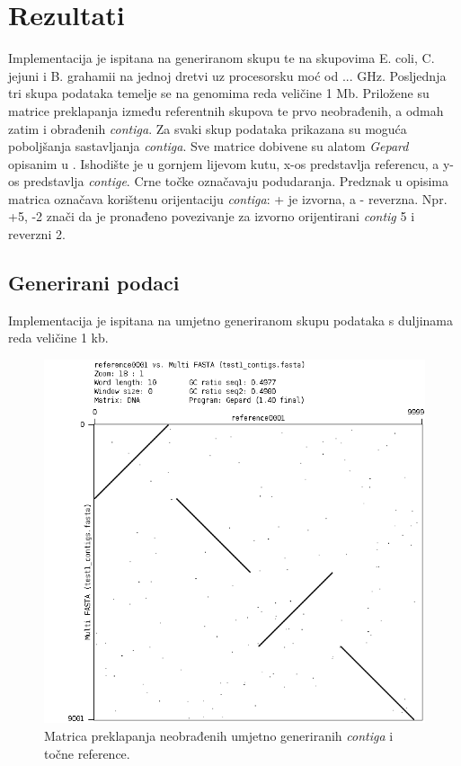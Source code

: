 \documentclass[times, utf8, seminar, numeric]{fer}
\begin{document}
\chapter{Rezultati}
Implementacija je ispitana na generiranom skupu te na skupovima E. coli, C. jejuni i B. grahamii na jednoj dretvi uz procesorsku moć od ... GHz. Posljednja tri skupa podataka temelje se na genomima reda veličine 1 Mb. Priložene su matrice preklapanja između referentnih skupova te prvo neobrađenih, a odmah zatim i obrađenih \textit{contiga}. Za svaki skup podataka prikazana su moguća poboljšanja sastavljanja \textit{contiga}. Sve matrice dobivene su alatom \textit{Gepard} opisanim u \cite{gepard}. Ishodište je u gornjem lijevom kutu, x-os predstavlja referencu, a y-os predstavlja \textit{contige}. Crne točke označavaju podudaranja. Predznak u opisima matrica označava korištenu orijentaciju \textit{contiga}: + je izvorna, a - reverzna. Npr. +5, -2 znači da je pronađeno povezivanje za izvorno orijentirani \textit{contig} 5 i reverzni 2.

\section{Generirani podaci}
Implementacija je ispitana na umjetno generiranom skupu podataka s duljinama reda veličine 1 kb.

\begin{figure}[h]
	\centering
	\centerline{\includegraphics[width=0.7\linewidth]{img/generated}}
	\caption{Matrica preklapanja neobrađenih umjetno generiranih \textit{contiga} i točne reference.}
	\label{fig:generated}
\end{figure}
\end{document}
